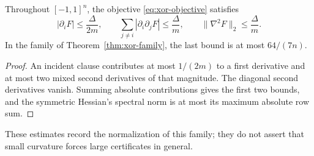 \begin{proposition}\label{prop:xor-sensitivity}
Throughout $[-1,1]^n$, the objective \eqref{eq:xor-objective} satisfies
\begin{equation}\label{eq:xor-sensitivity}
 |\partial_iF|\le\frac{\Delta}{2m},\qquad
 \sum_{j\ne i}|\partial_i\partial_jF|\le\frac{\Delta}{m},\qquad
 \|\nabla^2F\|_2\le\frac{\Delta}{m}.
\end{equation}
In the family of Theorem~\ref{thm:xor-family}, the last bound is at most
$64/(7n)$.
\end{proposition}
\begin{proof}
An incident clause contributes at most $1/(2m)$ to a first derivative
and at most two mixed second derivatives of that magnitude. The diagonal
second derivatives vanish. Summing absolute contributions gives the first
two bounds, and the symmetric Hessian's spectral norm is at most its
maximum absolute row sum.
\end{proof}
These estimates record the normalization of this family; they do not
assert that small curvature forces large certificates in general.
